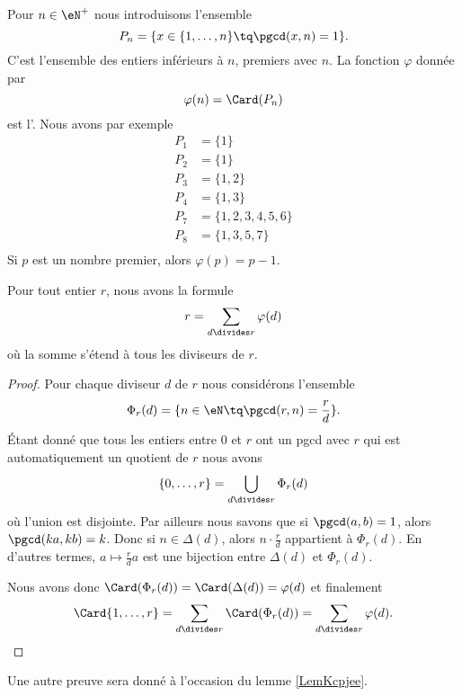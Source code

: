Pour \( n\in\eN^+\) nous introduisons l'ensemble
\begin{equation}    \label{EqDefPnEntierldeost}
    P_n=\{ x\in\{ 1,\ldots,n \}\tq\pgcd(x,n)=1 \}.
\end{equation}
C'est l'ensemble des entiers inférieurs à \( n\), premiers avec \( n\). La fonction \( \varphi\) donnée par
\begin{equation}    \label{EqEulerGqPsvi}
    \varphi(n)=\Card(P_n)
\end{equation}
est l'. Nous avons par exemple
\begin{subequations}
    \begin{align}
        P_1&=\{ 1 \}\\
        P_2&=\{ 1 \}\\
        P_3&=\{ 1,2 \}\\
        P_4&=\{ 1,3 \}\\
        P_7&=\{ 1,2,3,4,5,6 \}\\
        P_8&=\{ 1,3,5,7 \}\\
    \end{align}
\end{subequations}
Si \( p\) est un nombre premier, alors \( \varphi(p)=p-1\).

\begin{proposition}
    Pour tout entier \( r\), nous avons la formule
    \begin{equation}
        r=\sum_{d\divides r}\varphi(d)
    \end{equation}
    où la somme s'étend à tous les diviseurs de \( r\).
\end{proposition}

\begin{proof}
    Pour chaque diviseur \( d\) de \( r\) nous considérons l'ensemble
    \begin{equation}
        \Phi_r(d)=\{ n\in \eN\tq \pgcd(r,n)=\frac{ r }{ d } \}.
    \end{equation}
    Étant donné que tous les entiers entre \( 0\) et \( r\) ont un pgcd avec \( r\) qui est automatiquement un quotient de \( r\) nous avons
    \begin{equation}
        \{ 0,\ldots, r \}=\bigcup_{d\divides r}\Phi_r(d)
    \end{equation}
    où l'union est disjointe. Par ailleurs nous savons que si \( \pgcd(a,b)=1\), alors \( \pgcd(ka,kb)=k\). Donc si \( n\in \Delta(d)\), alors \( n\cdot \frac{ r }{ d }\) appartient à \( \Phi_r(d)\). En d'autres termes, \( a\mapsto \frac{ r }{ d }a\) est une bijection entre \( \Delta(d)\) et \( \Phi_r(d)\).

    Nous avons donc \( \Card(\Phi_r(d))=\Card(\Delta(d))=\varphi(d)\) et finalement
    \begin{equation}
        \Card\{ 1,\ldots, r \}=\sum_{d\divides r}\Card(\Phi_r(d))=\sum_{d\divides r}\varphi(d).
    \end{equation}
\end{proof}
Une autre preuve sera donné à l'occasion du lemme \ref{LemKcpjee}.

